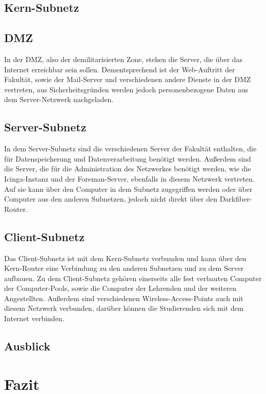 \documentclass[a4paper]{article}
\begin{document}
\subsection{Kern-Subnetz}

\subsection{DMZ}
In der DMZ, also der demilitarisierten Zone, stehen die Server, die über das Internet erreichbar sein sollen. Dementsprechend ist der Web-Auftritt der Fakultät, sowie der Mail-Server und verschiedenen andere Dienste in der DMZ vertreten, aus Sicherheitsgründen werden jedoch personenbezogene Daten aus dem Server-Netzwerk nachgeladen.

\subsection{Server-Subnetz}
In dem Server-Subnetz sind die verschiedenen Server der Fakultät enthalten, die für Datenspeicherung und Datenverarbeitung benötigt werden. Außerdem sind die Server, die für die Administration des Netzwerkes benötigt werden, wie die Icinga-Instanz und der Foreman-Server, ebenfalls in diesem Netzwerk vertreten. Auf sie kann über den Computer in dem Subnetz zugegriffen werden oder über Computer aus den anderen Subnetzen, jedoch nicht direkt über den Darkfiber-Router.

\subsection{Client-Subnetz}
Das Client-Subnetz ist mit dem Kern-Subnetz verbunden und kann über den Kern-Router eine Verbindung zu den anderen Subnetzen und zu dem Server aufbauen. Zu dem Client-Subnetz gehören einerseits alle fest verbauten Computer der Computer-Pools, sowie die Computer der Lehrenden und der weiteren Angestellten. Außerdem sind verschiedenen Wireless-Access-Points auch mit diesem Netzwerk verbunden, darüber können die Studierenden sich mit dem Internet verbinden.

\subsection{Ausblick}

\section{Fazit}
\end{document}
